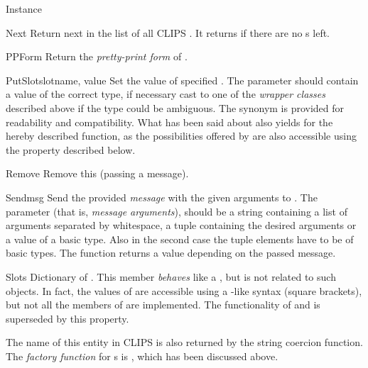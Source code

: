 \begin{classdesc*}{Instance}
\begin{methoddesc}{Next}{}
Return next  in the list of all CLIPS .
It returns  if there are no s left.
\end{methoddesc}

\begin{methoddesc}{PPForm}{}
Return the \emph{pretty-print form} of .
\end{methoddesc}

\begin{methoddesc}{PutSlot}{slotname, value}
Set the value of specified . The  parameter should
contain a value of the correct type, if necessary cast to one of the
\emph{wrapper classes} described above if the type could be ambiguous.
The synonym  is provided for readability and
compatibility. What has been said about  also yields
for the hereby described function, as the possibilities offered by
 are also accessible using the  property
described below.
\end{methoddesc}

\begin{methoddesc}{Remove}{}
Remove this  (passing a message).
\end{methoddesc}

\begin{methoddesc}{Send}{msg }
Send the provided \emph{message} with the given arguments to
. The  parameter (that is, \emph{message
arguments}), should be a string containing a list of arguments
separated by whitespace, a tuple containing the desired arguments or a
value of a basic type. Also in the second case the tuple elements have
to be of basic types. The function returns a value depending on the
passed message.
\end{methoddesc}

\begin{memberdesc}[property]{Slots}
Dictionary of  . This member \emph{behaves}
like a , but is not related to such objects. In fact, the
values of  are accessible using a -like syntax
(square brackets), but not all the members of  are
implemented. The functionality of  and
 is superseded by this property.
\end{memberdesc}

The name of this entity in CLIPS is also returned by the string coercion
function. The \emph{factory function} for s is
, which has been discussed above.


\end{classdesc*}
